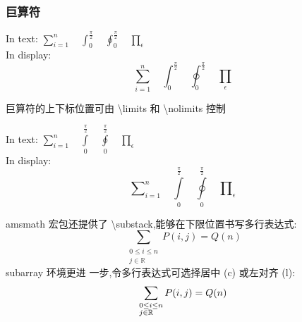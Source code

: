 \documentclass[a4paper]{ctexart}
\begin{document}
    \subsubsection{巨算符}
    In text:
    $
        \sum_{i=1}^n   \quad
        \int_0^{\frac{\pi}{2}}   \quad
        \oint_0^{\frac{\pi}{2}} \quad
        \prod_{\epsilon}
    $\\
    In display:
    \[
        \sum_{i=1}^n    \quad 
        \int_0^{\frac{\pi}{2}}\quad
        \oint_0^{\frac{\pi}{2}} \quad 
        \prod_{\epsilon}    
    \]\par
    巨算符的上下标位置可由 \textbackslash limits 和 \textbackslash nolimits 控制\par
    In text:
    $
        \sum\limits_{i=1}^n \quad
        \int\limits_0^{\frac{\pi}{2}}   \quad
        \oint\limits_0^{\frac{\pi}{2}}  \quad
        \prod\limits_{\epsilon}
    $\\
    In display:
    \[
        \sum\nolimits_{i = 1}^n \quad
        \int\limits_0^{\frac{\pi}{2}} \quad
        \oint\limits_0^{\frac{\pi}{2}} \quad
        \prod\nolimits_{\epsilon}    
    \]\par
    amsmath 宏包还提供了 \textbackslash substack,能够在下限位置书写多行表达式:
    \[
        \sum_{\substack{0\le i\le n\\
                        j\in\mathbb{R}}} P(i,j) = Q(n)    
    \]
    subarray 环境更进 一步,令多行表达式可选择居中 (c) 或左对齐 (l):
    \[
        \sum_{\begin{subarray}{l}
                    0\le i\le n\\
                    j\in\mathbb{R}
              \end{subarray}} P(i,j) = 
        Q(n)
    \]
\end{document}
